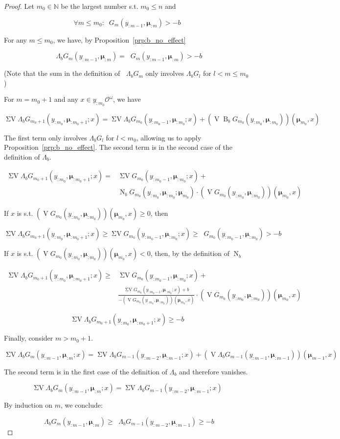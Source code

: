 \documentclass[11pt]{article}
\theoremstyle{definition}
\theoremstyle{plain}
\newcommand{\Nats}{\mathbb{N}}
\newcommand{\B}{\operatorname{B}}
\newcommand{\Ob}{\mathcal{O}}
\newcommand{\OO}{\Ob^\omega}
\DeclareMathOperator{\V}{V}
\DeclareMathOperator{\SV}{\Sigma V}
\DeclareMathOperator{\SVM}{\Sigma V_{\min}}
\DeclareMathOperator{\Nr}{N}
\newcommand{\Bd}{\Lambda}
\newcommand{\BM}{\bm{\mu}}
\begin{document}
\begin{proof}

Let ${m_0 \in \Nats}$ be the largest number s.t. ${m_0 \leq n}$ and 

$$\forall m \leq m_0: \SVM G_m(y_{:m-1},\BM_{:m}) > -b$$

For any ${m \leq m_0}$, we have, by Proposition~\ref{prp:b_no_effect}

$$\SVM \Bd_b G_m(y_{:m-1},\BM_{:m})=\SVM G_m(y_{:m-1},\BM_{:m}) > -b$$

(Note that the sum in the definition of ${\SVM \Bd_b G_m}$ only involves ${\Bd_b G_l}$ for ${l < m \leq m_0}$)

For ${m=m_0+1}$ and any $x \in y_{:m_0}\OO$, we have

$$\SV \Bd_b G_{m_0+1}(y_{:m_0},\BM_{:m_0+1};x) = \SV \Bd_b G_{m_0}(y_{:m_0-1},\BM_{:m_0};x) + (\V \B_b G_{m_0}(y_{:m_0},\BM_{:m_0}))(\BM_{m_0},x)$$

The first term only involves ${\Bd_b G_l}$ for ${l < m_0}$, allowing us to apply Proposition~\ref{prp:b_no_effect}. The second term is in the second case of the definition of $\Bd_b$.

\begin{align*}
\SV \Bd_b G_{m_0+1}(y_{:m_0},\BM_{:m_0+1};x) = &\SV G_{m_0}(y_{:m_0-1},\BM_{:m_0};x) +\\ &\Nr_b G_{m_0}(y_{:m_0},\BM_{:m_0};\BM_{m_0}) \cdot (\V G_{m_0}(y_{:m_0},\BM_{:m_0}))(\BM_{m_0},x)
\end{align*}

If ${x}$ is s.t. ${(\V G_{m_0}(y_{:m_0},\BM_{:m_0}))(\BM_{m_0},x) \geq 0}$, then

\[\SV \Bd_b G_{m_0+1}(y_{:m_0},\BM_{:m_0+1};x) \geq \SV G_{m_0}(y_{:m_0-1},\BM_{:m_0};x)\geq \SVM G_{m_0}(y_{:m_0-1},\BM_{:m_0}) > -b\]

If ${x}$ is s.t. ${(\V G_{m_0}(y_{:m_0},\BM_{:m_0}))(\BM_{m_0},x) < 0}$, then, by the definition of $\Nr_b$

\begin{align*}
\SV \Bd_b G_{m_0+1}(y_{:m_0},\BM_{:m_0+1};x) \geq &\SV G_{m_0}(y_{:m_0-1},\BM_{:m_0};x)+ \\
&\frac{\SV G_{m_0}(y_{:m_0-1},\BM_{:m_0};x) + b}{-(\V G_{m_0}(y_{:m_0},\BM_{:m_0}))(\BM_{m_0},x)} \cdot (\V G_{m_0}(y_{:m_0},\BM_{:m_0}))(\BM_{m_0},x)
\end{align*}

$$\SV \Bd_b G_{m_0+1}(y_{:m_0},\BM_{:m_0+1};x) \geq -b$$

Finally, consider ${m > m_0 + 1}$.

$$\SV \Bd_b G_{m}(y_{:m-1},\BM_{:m};x) = \SV \Bd_b G_{m-1}(y_{:m-2},\BM_{:m-1};x) + (\V \Bd_b G_{m-1}(y_{:m-1},\BM_{:m-1}))(\BM_{m-1},x)$$

The second term is in the first case of the definition of $\Bd_b$ and therefore vanishes.

$$\SV \Bd_b G_{m}(y_{:m-1},\BM_{:m};x) = \SV \Bd_b G_{m-1}(y_{:m-2},\BM_{:m-1};x)$$

By induction on ${m}$, we conclude:

$$\SVM \Bd_b G_{m}(y_{:m-1},\BM_{:m}) \geq \SVM \Bd_b G_{m-1}(y_{:m-2},\BM_{:m-1}) \geq -b$$
\end{proof}
\end{document}
